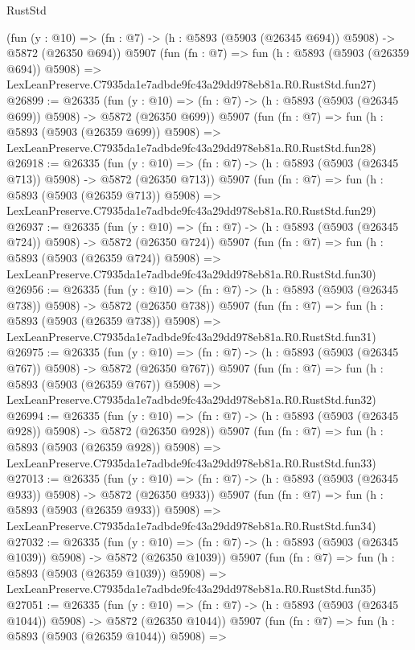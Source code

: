\begin{lexlean}{RustStd}
\begin{coremodule}
    (fun (y : @10) => (fn : @7) -> (h : @5893 (@5903 (@26345 @694)) @5908) -> @5872 (@26350 @694))
    @5907
    (fun (fn : @7) =>
    fun (h : @5893 (@5903 (@26359 @694)) @5908) =>
    LexLeanPreserve.C7935da1e7adbde9fc43a29dd978eb81a.R0.RustStd.fun27)
@26899 := @26335
    (fun (y : @10) => (fn : @7) -> (h : @5893 (@5903 (@26345 @699)) @5908) -> @5872 (@26350 @699))
    @5907
    (fun (fn : @7) =>
    fun (h : @5893 (@5903 (@26359 @699)) @5908) =>
    LexLeanPreserve.C7935da1e7adbde9fc43a29dd978eb81a.R0.RustStd.fun28)
@26918 := @26335
    (fun (y : @10) => (fn : @7) -> (h : @5893 (@5903 (@26345 @713)) @5908) -> @5872 (@26350 @713))
    @5907
    (fun (fn : @7) =>
    fun (h : @5893 (@5903 (@26359 @713)) @5908) =>
    LexLeanPreserve.C7935da1e7adbde9fc43a29dd978eb81a.R0.RustStd.fun29)
@26937 := @26335
    (fun (y : @10) => (fn : @7) -> (h : @5893 (@5903 (@26345 @724)) @5908) -> @5872 (@26350 @724))
    @5907
    (fun (fn : @7) =>
    fun (h : @5893 (@5903 (@26359 @724)) @5908) =>
    LexLeanPreserve.C7935da1e7adbde9fc43a29dd978eb81a.R0.RustStd.fun30)
@26956 := @26335
    (fun (y : @10) => (fn : @7) -> (h : @5893 (@5903 (@26345 @738)) @5908) -> @5872 (@26350 @738))
    @5907
    (fun (fn : @7) =>
    fun (h : @5893 (@5903 (@26359 @738)) @5908) =>
    LexLeanPreserve.C7935da1e7adbde9fc43a29dd978eb81a.R0.RustStd.fun31)
@26975 := @26335
    (fun (y : @10) => (fn : @7) -> (h : @5893 (@5903 (@26345 @767)) @5908) -> @5872 (@26350 @767))
    @5907
    (fun (fn : @7) =>
    fun (h : @5893 (@5903 (@26359 @767)) @5908) =>
    LexLeanPreserve.C7935da1e7adbde9fc43a29dd978eb81a.R0.RustStd.fun32)
@26994 := @26335
    (fun (y : @10) => (fn : @7) -> (h : @5893 (@5903 (@26345 @928)) @5908) -> @5872 (@26350 @928))
    @5907
    (fun (fn : @7) =>
    fun (h : @5893 (@5903 (@26359 @928)) @5908) =>
    LexLeanPreserve.C7935da1e7adbde9fc43a29dd978eb81a.R0.RustStd.fun33)
@27013 := @26335
    (fun (y : @10) => (fn : @7) -> (h : @5893 (@5903 (@26345 @933)) @5908) -> @5872 (@26350 @933))
    @5907
    (fun (fn : @7) =>
    fun (h : @5893 (@5903 (@26359 @933)) @5908) =>
    LexLeanPreserve.C7935da1e7adbde9fc43a29dd978eb81a.R0.RustStd.fun34)
@27032 := @26335
    (fun (y : @10) => (fn : @7) -> (h : @5893 (@5903 (@26345 @1039)) @5908) -> @5872 (@26350 @1039))
    @5907
    (fun (fn : @7) =>
    fun (h : @5893 (@5903 (@26359 @1039)) @5908) =>
    LexLeanPreserve.C7935da1e7adbde9fc43a29dd978eb81a.R0.RustStd.fun35)
@27051 := @26335
    (fun (y : @10) => (fn : @7) -> (h : @5893 (@5903 (@26345 @1044)) @5908) -> @5872 (@26350 @1044))
    @5907
    (fun (fn : @7) =>
    fun (h : @5893 (@5903 (@26359 @1044)) @5908) =>

\end{coremodule}
\end{lexlean}
